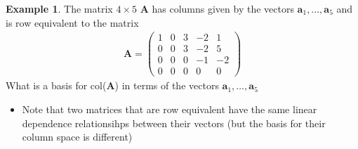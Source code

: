 \documentclass[
]{book}
\providecommand{\tightlist}{%
  \setlength{\itemsep}{0pt}\setlength{\parskip}{0pt}}
\theoremstyle{definition}
\theoremstyle{definition}
\newtheorem{example}{Example}[chapter]
\theoremstyle{definition}
\theoremstyle{definition}
\theoremstyle{remark}
\begin{document}
\begin{example}
The matrix \(4 \times 5\) \(\mathbf{A}\) has columns given by the vectors \(\mathbf{a}_1, \ldots, \mathbf{a}_5\) and is row equivalent to the matrix
\[
\begin{aligned}
\mathbf{A} = \begin{pmatrix} 1 & 0 & 3 & -2 & 1 \\ 0 & 0 & 3 & -2 & 5 \\ 0 & 0 & 0 & -1 & -2 \\ 0 & 0 & 0 & 0 & 0 \end{pmatrix}
\end{aligned}
\]
What is a basis for col(\(\mathbf{A}\)) in terms of the vectors \(\mathbf{a}_1, \ldots, \mathbf{a}_5\)
\end{example}

\begin{itemize}
\tightlist
\item
  Note that two matrices that are row equivalent have the same linear dependence relationsihps between their vectors (but the basis for their column space is different)
\end{itemize}
\end{document}
